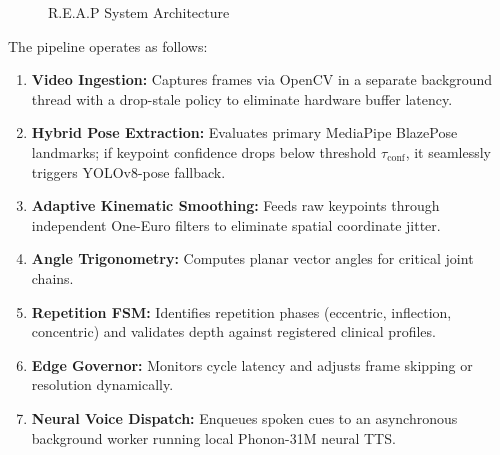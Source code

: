 \documentclass[12pt]{report}
\begin{document}
\begin{figure}[H]
{
}
\caption{R.E.A.P System Architecture}
\label{fig:sys_arch}
\end{figure}

The pipeline operates as follows:
\begin{enumerate}
    \item \textbf{Video Ingestion:} Captures frames via OpenCV in a separate background thread with a drop-stale policy to eliminate hardware buffer latency.
    \item \textbf{Hybrid Pose Extraction:} Evaluates primary MediaPipe BlazePose landmarks; if keypoint confidence drops below threshold $\tau_{\text{conf}}$, it seamlessly triggers YOLOv8-pose fallback.
    \item \textbf{Adaptive Kinematic Smoothing:} Feeds raw keypoints through independent One-Euro filters to eliminate spatial coordinate jitter.
    \item \textbf{Angle Trigonometry:} Computes planar vector angles for critical joint chains.
    \item \textbf{Repetition FSM:} Identifies repetition phases (eccentric, inflection, concentric) and validates depth against registered clinical profiles.
    \item \textbf{Edge Governor:} Monitors cycle latency and adjusts frame skipping or resolution dynamically.
    \item \textbf{Neural Voice Dispatch:} Enqueues spoken cues to an asynchronous background worker running local Phonon-31M neural TTS.
\end{enumerate}
\end{document}
